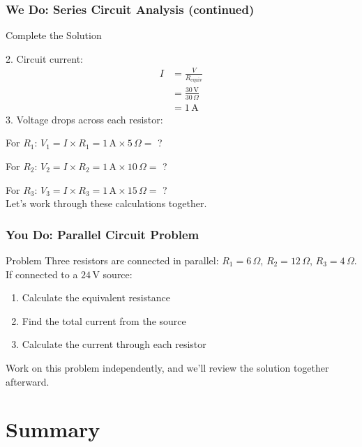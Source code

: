 \documentclass{beamer}
\begin{document}
\begin{frame}
\frametitle{We Do: Series Circuit Analysis (continued)}
\begin{block}{Complete the Solution}


2. Circuit current:
\begin{align}
I &= \frac{V}{R_{\text{equiv}}} \\
&= \frac{30 \, \text{V}}{30 \, \Omega} \\
&= 1 \, \text{A}
\end{align}
3. Voltage drops across each resistor:

For $R_1$: $V_1 = I \times R_1 = 1 \, \text{A} \times 5 \, \Omega = $ ?

For $R_2$: $V_2 = I \times R_2 = 1 \, \text{A} \times 10 \, \Omega = $ ?

For $R_3$: $V_3 = I \times R_3 = 1 \, \text{A} \times 15 \, \Omega = $ ?
\\
Let's work through these calculations together.
\end{block}


\end{frame}

\begin{frame}
\frametitle{You Do: Parallel Circuit Problem}
\begin{exampleblock}{Problem}
Three resistors are connected in parallel: $R_1 = 6 \, \Omega$, $R_2 = 12 \, \Omega$, $R_3 = 4 \, \Omega$. If connected to a $24 \, \text{V}$ source:
\begin{enumerate}
\item Calculate the equivalent resistance
\item Find the total current from the source
\item Calculate the current through each resistor
\end{enumerate}
\end{exampleblock}

Work on this problem independently, and we'll review the solution together afterward.
\end{frame}

\section{Summary}
\end{document}
